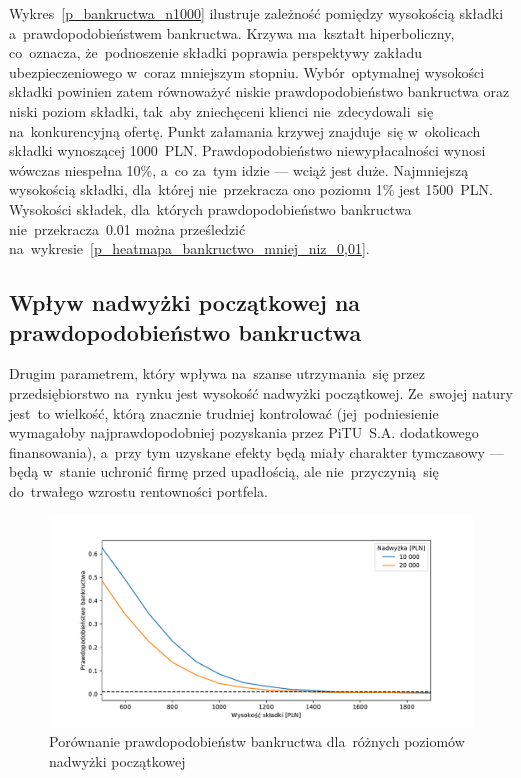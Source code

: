 \documentclass[12pt, a4paper, oneside]{mwart} %
\begin{document}
Wykres~\ref{p_bankructwa_n1000} ilustruje zależność pomiędzy wysokością składki a~prawdopodobieństwem bankructwa. Krzywa ma~kształt hiperboliczny, co~oznacza, że~podnoszenie składki poprawia perspektywy zakładu ubezpieczeniowego w~coraz mniejszym stopniu. Wybór~optymalnej wysokości składki powinien zatem równoważyć niskie prawdopodobieństwo bankructwa oraz niski poziom składki, tak~aby zniechęceni klienci nie~zdecydowali~się na~konkurencyjną ofertę. Punkt załamania krzywej znajduje~się w~okolicach składki wynoszącej 1000~PLN. Prawdopodobieństwo niewypłacalności wynosi wówczas niespełna 10\%, a~co za~tym idzie --- wciąż jest duże. Najmniejszą wysokością składki, dla~której nie~przekracza ono poziomu 1\% jest 1500~PLN. Wysokości składek, dla~których prawdopodobieństwo bankructwa nie~przekracza~0.01 można prześledzić na~wykresie~\ref{p_heatmapa_bankructwo_mniej_niz_0,01}.

\subsection{Wpływ nadwyżki początkowej na prawdopodobieństwo bankructwa}
Drugim parametrem, który wpływa na~szanse utrzymania~się przez przedsiębiorstwo na~rynku jest wysokość nadwyżki początkowej. Ze~swojej natury jest~to wielkość, którą znacznie trudniej kontrolować (jej~podniesienie wymagałoby najprawdopodobniej pozyskania przez PiTU~S.A. dodatkowego finansowania), a~przy tym uzyskane efekty będą miały charakter tymczasowy --- będą w~stanie uchronić firmę przed upadłością, ale nie~przyczynią~się do~trwałego wzrostu rentowności portfela.

\begin{figure}
\centering
\includegraphics[width = \textwidth]{n=1000/p_bankructwa_porownanie.pdf}
\caption{Porównanie prawdopodobieństw bankructwa dla~różnych poziomów nadwyżki początkowej}
\label{p_bankructwa_porownanie_n1000}
\end{figure}
\end{document}
